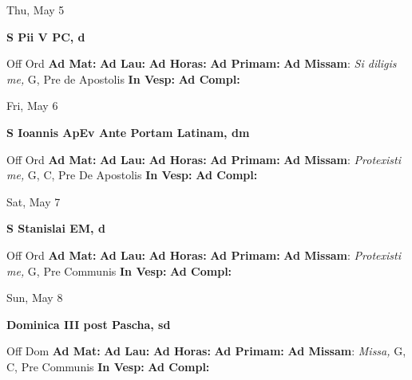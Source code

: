 \documentclass[10pt]{article}
\begin{document}
\begin{minipage}{3.5in}
\vspace{2em}\begin{center}
Thu, May 5
\end{center}\textbf{ \large S Pii V PC, \textnormal{\normalsize d}}
\begin{justify}
Off Ord
\textbf{Ad Mat: }
\textbf{Ad Lau: }
\textbf{Ad Horas: }
\textbf{Ad Primam: }
\textbf{Ad Missam}: \textit{Si diligis me,} G, Pre de Apostolis
\textbf{In Vesp: }
\textbf{Ad Compl: }\end{justify}
\end{minipage}



\begin{minipage}{3.5in}
\vspace{2em}\begin{center}
Fri, May 6
\end{center}\textbf{ \large S Ioannis ApEv Ante Portam Latinam, \textnormal{\normalsize dm}}
\begin{justify}
Off Ord
\textbf{Ad Mat: }
\textbf{Ad Lau: }
\textbf{Ad Horas: }
\textbf{Ad Primam: }
\textbf{Ad Missam}: \textit{Protexisti me,} G, C, Pre De Apostolis
\textbf{In Vesp: }
\textbf{Ad Compl: }\end{justify}
\end{minipage}



\begin{minipage}{3.5in}
\vspace{2em}\begin{center}
Sat, May 7
\end{center}\textbf{ \large S Stanislai EM, \textnormal{\normalsize d}}
\begin{justify}
Off Ord
\textbf{Ad Mat: }
\textbf{Ad Lau: }
\textbf{Ad Horas: }
\textbf{Ad Primam: }
\textbf{Ad Missam}: \textit{Protexisti me,} G, Pre Communis
\textbf{In Vesp: }
\textbf{Ad Compl: }\end{justify}
\end{minipage}



\begin{minipage}{3.5in}
\vspace{2em}\begin{center}
Sun, May 8
\end{center}\textbf{ \large Dominica III post Pascha, \textnormal{\normalsize sd}}
\begin{justify}
Off Dom
\textbf{Ad Mat: }
\textbf{Ad Lau: }
\textbf{Ad Horas: }
\textbf{Ad Primam: }
\textbf{Ad Missam}: \textit{Missa,} G, C, Pre Communis
\textbf{In Vesp: }
\textbf{Ad Compl: }\end{justify}
\end{minipage}
\end{document}
